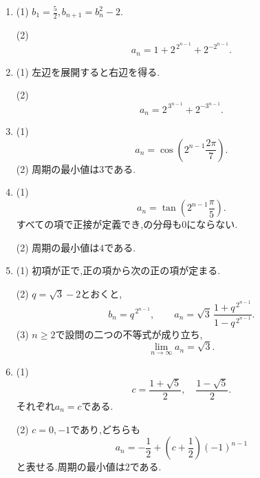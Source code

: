 \begin{enumerate}[label=\textbf{問\arabic*.},leftmargin=3.8em,format=\bookitemlink{practice-special}{answer}{problem}]
                \[
                  a_{2k-1}=\frac1k,\qquad
                  a_{2k}=\frac2{2k-1}\quad(k\ge1).
                \]
                (2) は$\displaystyle 0$である.
          \item (1) $\displaystyle b_1=\frac52$,\,$\displaystyle b_{n+1}=b_n^2-2$.
                \par\smallskip\noindent
                (2)
                \[
                  a_n=1+2^{\,2^{n-1}}+2^{-2^{n-1}}.
                \]
          \item (1) 左辺を展開すると右辺を得る.
                \par\smallskip\noindent
                (2)
                \[
                  a_n=2^{\,3^{n-1}}+2^{-3^{n-1}}.
                \]
          \item (1)
                \[
                  a_n=\cos\left(2^{n-1}\frac{2\pi}{7}\right).
                \]
                (2) 周期の最小値は$\displaystyle 3$である.
          \item (1)
                \[
                  a_n=\tan\left(2^{n-1}\frac{\pi}{5}\right).
                \]
                すべての項で正接が定義でき,の分母も$\displaystyle 0$にならない.
                \par\smallskip\noindent
                (2) 周期の最小値は$\displaystyle 4$である.
          \item (1) 初項が正で,正の項から次の正の項が定まる.
                \par\smallskip\noindent
                (2) $\displaystyle q=\sqrt3-2$とおくと,
                \[
                  b_n=q^{\,2^{n-1}},\qquad
                  a_n=\sqrt3\,\frac{1+q^{\,2^{n-1}}}{1-q^{\,2^{n-1}}}.
                \]
                (3) $\displaystyle n\ge2$で設問の二つの不等式が成り立ち,
                \[
                  \lim_{n\to\infty}a_n=\sqrt3.
                \]
          \item (1)
                \[
                  c=\frac{1+\sqrt5}{2},\quad
                  \frac{1-\sqrt5}{2}.
                \]
                それぞれ$\displaystyle a_n=c$である.
                \par\smallskip\noindent
                (2) $\displaystyle c=0,-1$であり,どちらも
                \[
                  a_n=-\frac12+\left(c+\frac12\right)(-1)^{n-1}
                \]
                と表せる.周期の最小値は$\displaystyle 2$である.

\end{enumerate}
